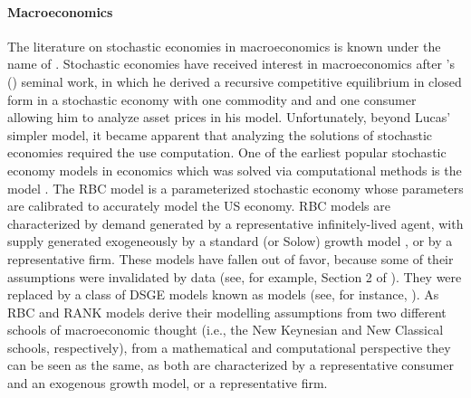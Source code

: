 



 



\paragraph{Macroeconomics}

The literature on stochastic economies in macroeconomics is known under the name of . Stochastic economies have received interest in macroeconomics after \citeauthor{lucas1978asset}'s (\citeyear{lucas1978asset}) seminal work, in which he derived a recursive competitive equilibrium in closed form in a stochastic economy with one commodity and and one consumer allowing him to analyze asset prices in his model. Unfortunately, beyond Lucas' simpler model, it became apparent that analyzing the solutions of stochastic economies required the use computation. 
One of the earliest popular stochastic economy models in economics which was solved via computational methods is the  model \cite{kydland1982time, long1983real}. The RBC model is a parameterized stochastic economy whose parameters are calibrated to accurately model the US economy. RBC models are characterized by demand generated by a representative infinitely-lived agent, with supply generated exogeneously by a standard (or Solow) growth model \cite{acemoglu2008introduction}, or by a representative firm.
These models have fallen out of favor, because some of their assumptions were invalidated by data (see, for example, Section 2 of \citet{christiano2018dsge}).
They were replaced by a class of DSGE models known as  models (see, for instance, \citet{clarida2000monetary}). As RBC and RANK models derive their modelling assumptions from two different schools of macroeconomic thought (i.e., the New Keynesian and New Classical schools, respectively),%
from a mathematical and computational perspective they can be seen as the same, as both are characterized by a representative consumer and an exogenous growth model, or a representative firm.

